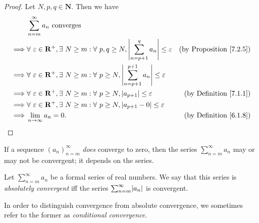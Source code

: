 \begin{proof}
    Let \(N, p, q \in \mathbf{N}\).
    Then we have
    \begin{align*}
                 & \sum_{n = m}^\infty a_n \text{ converges}                                                                                                                                \\
        \implies & \forall\ \varepsilon \in \mathbf{R}^+, \exists\ N \geq m : \forall\ p, q \geq N, \abs*{\sum_{n = p + 1}^q a_n} \leq \varepsilon    & \text{(by Proposition \ref{7.2.5})} \\
        \implies & \forall\ \varepsilon \in \mathbf{R}^+, \exists\ N \geq m : \forall\ p \geq N, \abs*{\sum_{n = p + 1}^{p + 1} a_n} \leq \varepsilon                                       \\
        \implies & \forall\ \varepsilon \in \mathbf{R}^+, \exists\ N \geq m : \forall\ p \geq N, \abs*{a_{p + 1}} \leq \varepsilon                    & \text{(by Definition \ref{7.1.1})}  \\
        \implies & \forall\ \varepsilon \in \mathbf{R}^+, \exists\ N \geq m : \forall\ p \geq N, \abs*{a_{p + 1} - 0} \leq \varepsilon                                                      \\
        \implies & \lim_{n \to \infty} a_n = 0.                                                                                                       & \text{(by Definition \ref{6.1.8})}
    \end{align*}
\end{proof}

\begin{note}
    If a sequence \((a_n)_{n = m}^\infty\) \emph{does} converge to zero, then the series \(\sum_{n = m}^\infty a_n\) may or may not be convergent;
    it depends on the series.
\end{note}

\setcounter{theorem}{7}
\begin{definition}\label{7.2.8}
    Let \(\sum_{n = m}^\infty a_n\) be a formal series of real numbers.
    We say that this series is \emph{absolutely convergent} iff the series \(\sum_{n = m}^\infty \abs*{a_n}\) is convergent.
\end{definition}

\begin{note}
    In order to distinguish convergence from absolute convergence, we sometimes refer to the former as \emph{conditional convergence}.
\end{note}

